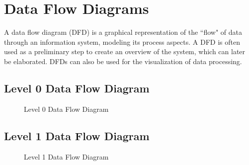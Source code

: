 \documentclass[oneside,a4paper,12pt]{report}
\begin{document}
\section{Data Flow Diagrams}
\hspace*{0.5cm} A data flow diagram (DFD) is a graphical representation of the ``flow" of data through an information system, modeling its process aspects. A DFD is often used as a preliminary step to create an overview of the system, which can later be elaborated. DFDs can also be used for the visualization of data processing.  

\subsection{Level 0 Data Flow Diagram}
\begin{center}
	\begin{figure}[!htbp]
		\centering
   	    \caption{Level 0 Data Flow Diagram}
	    \label{fig:Level 0 Data Flow Diagram}
	\end{figure}
\end{center}

\subsection{Level 1 Data Flow Diagram}
 \begin{center}
	\begin{figure}[!htbp]
		\centering
	    \caption{Level 1 Data Flow Diagram}
	    \label{fig:Level 1 Data Flow Diagram}
	\end{figure}
\end{center}
\end{document}
